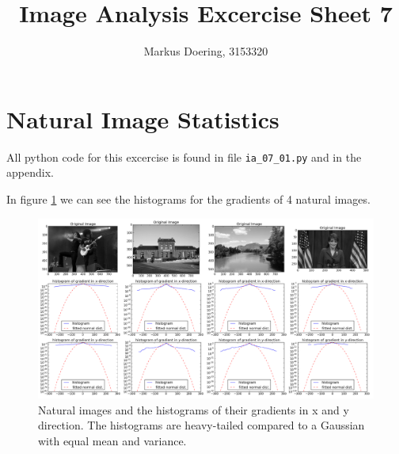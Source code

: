 \documentclass[11pt,a4paper]{scrartcl}
\begin{document}
\lstset{
    style=customc
} 

\title{Image Analysis Excercise Sheet 7}
\author{Markus Doering, 3153320}
\maketitle

\section{Natural Image Statistics}
All python code for this excercise is found in file \verb$ia_07_01.py$ and in the appendix. 

In figure \ref{fig:1} we can see the histograms for the gradients of 4 natural images. 

\begin{figure}[hb]\label{fig:1}
\includegraphics[width=.99\linewidth]{histograms_cut.png}
\caption{Natural images and the histograms of their gradients in x and y direction. The histograms are heavy-tailed compared to a Gaussian with equal mean and variance.}
\end{figure}

\end{document}
